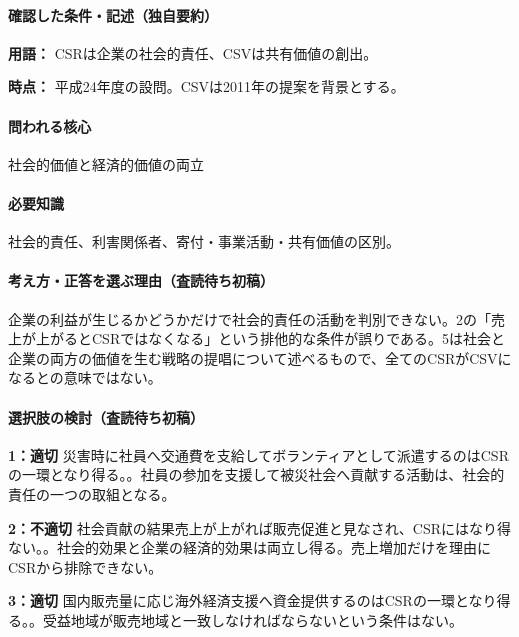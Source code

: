 \paragraph{確認した条件・記述（独自要約）}\mbox{}\par

\noindent\textbf{用語：} CSRは企業の社会的責任、CSVは共有価値の創出。\par

\noindent\textbf{時点：} 平成24年度の設問。CSVは2011年の提案を背景とする。\par

\paragraph{問われる核心} 社会的価値と経済的価値の両立

\paragraph{必要知識} 社会的責任、利害関係者、寄付・事業活動・共有価値の区別。

\paragraph{考え方・正答を選ぶ理由（査読待ち初稿）} 企業の利益が生じるかどうかだけで社会的責任の活動を判別できない。2の「売上が上がるとCSRではなくなる」という排他的な条件が誤りである。5は社会と企業の両方の価値を生む戦略の提唱について述べるもので、全てのCSRがCSVになるとの意味ではない。

\paragraph{選択肢の検討（査読待ち初稿）}\mbox{}\par

\noindent\textbf{1：適切} 災害時に社員へ交通費を支給してボランティアとして派遣するのはCSRの一環となり得る。。社員の参加を支援して被災社会へ貢献する活動は、社会的責任の一つの取組となる。\par

\noindent\textbf{2：不適切} 社会貢献の結果売上が上がれば販売促進と見なされ、CSRにはなり得ない。。社会的効果と企業の経済的効果は両立し得る。売上増加だけを理由にCSRから排除できない。\par

\noindent\textbf{3：適切} 国内販売量に応じ海外経済支援へ資金提供するのはCSRの一環となり得る。。受益地域が販売地域と一致しなければならないという条件はない。\par

